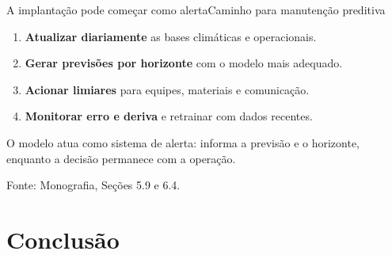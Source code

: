 \documentclass[10pt]{beamer}
\newcommand{\source}[1]{%
  \par\vfill{\raggedleft\tiny\color{gray}Fonte: #1\par}%
}
\begin{document}
\begin{frame}{A implantação pode começar como alerta}{Caminho para manutenção preditiva}
  \begin{enumerate}
    \item \textbf{Atualizar diariamente} as bases climáticas e operacionais.
    \item \textbf{Gerar previsões por horizonte} com o modelo mais adequado.
    \item \textbf{Acionar limiares} para equipes, materiais e comunicação.
    \item \textbf{Monitorar erro e deriva} e retrainar com dados recentes.
  \end{enumerate}

  \vspace{0.8em}
  \begin{block}{}
    O modelo atua como sistema de alerta: informa a previsão e o horizonte, enquanto a decisão permanece com a operação.
  \end{block}

  \source{Monografia, Seções 5.9 e 6.4.}
\end{frame}

\section{Conclusão}
\end{document}
